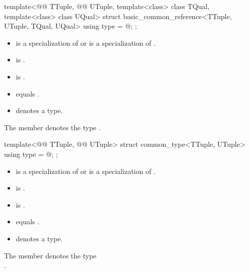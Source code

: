 %
\begin{itemdecl}
template<@@ TTuple, @@ UTuple,
         template<class> class TQual, template<class> class UQual>
struct basic_common_reference<TTuple, UTuple, TQual, UQual> {
  using type = @\seebelow@;
};
\end{itemdecl}

\begin{itemdescr}
\pnum
\constraints
\begin{itemize}
\item
{} is a specialization of  or
 is a specialization of .
\item
{} is .
\item
{} is .
\item
{} equals .
\item
{}
denotes a type.
\end{itemize}

\pnum
\result
The member   denotes the type
.
\end{itemdescr}

%
\begin{itemdecl}
template<@@ TTuple, @@ UTuple>
struct common_type<TTuple, UTuple> {
  using type = @\seebelow@;
};
\end{itemdecl}

\begin{itemdescr}
\pnum
\constraints
\begin{itemize}
\item
{} is a specialization of  or
 is a specialization of .
\item
{} is .
\item
{} is .
\item
{} equals .
\item
{} denotes a type.
\end{itemize}

\pnum
\result
The member   denotes the type\\
.
\end{itemdescr}

